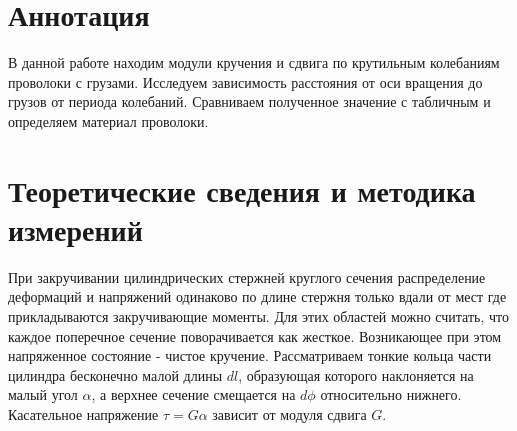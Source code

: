 \section{Аннотация}

    В данной работе находим модули кручения и сдвига по крутильным колебаниям проволоки с грузами. Исследуем зависимость расстояния от оси вращения до грузов от периода колебаний. Сравниваем полученное значение с табличным и определяем материал проволоки.



\section{Теоретические сведения и методика измерений}

    При закручивании цилиндрических стержней круглого сечения распределение деформаций и напряжений одинаково по длине стержня только вдали от мест где прикладываются закручивающие моменты. Для этих областей можно считать, что каждое поперечное сечение поворачивается как жесткое. Возникающее при этом напряженное состояние - чистое кручение. Рассматриваем тонкие кольца части цилиндра бесконечно малой длины $dl$, образующая которого наклоняется на малый угол $\alpha$, а верхнее сечение смещается на $d\phi$ относительно нижнего. Касательное напряжение $\tau = G\alpha$ зависит от модуля сдвига $G$.
    
